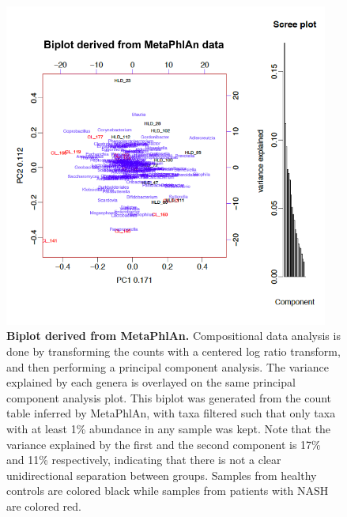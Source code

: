 \begin{figure}[h]
\begin{center}
\includegraphics[width=0.95\textwidth]{metaphlan_biplot.png}
\caption[Biplot derived from MetaPhlAn.]{\textbf{Biplot derived from MetaPhlAn.} Compositional data analysis is done by transforming the counts with a centered log ratio transform, and then performing a principal component analysis. The variance explained by each genera is overlayed on the same principal component analysis plot. This biplot was generated from the count table inferred by MetaPhlAn, with taxa filtered such that only taxa with at least 1\% abundance in any sample was kept. Note that the variance explained by the first and the second component is 17\% and 11\% respectively, indicating that there is not a clear unidirectional separation between groups. Samples from healthy controls are colored black while samples from patients with NASH are colored red.}
\label{nafld_metaphlan_biplot}
\end{center}
\end{figure}

